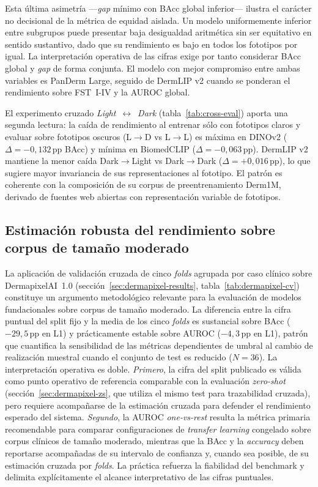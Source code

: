 Esta última asimetría ---\emph{gap} mínimo con BAcc global
inferior--- ilustra el carácter no decisional de la métrica de
equidad aislada. Un modelo uniformemente inferior entre subgrupos
puede presentar baja desigualdad aritmética sin ser equitativo en
sentido sustantivo, dado que su rendimiento es bajo en todos los
fototipos por igual. La interpretación operativa de las cifras
exige por tanto considerar BAcc global y \emph{gap} de forma
conjunta. El modelo con mejor compromiso entre ambas variables es
PanDerm Large, seguido de DermLIP v2 cuando se ponderan el
rendimiento sobre FST~I-IV y la AUROC global.

El experimento cruzado \emph{Light}~$\leftrightarrow$~\emph{Dark}
(tabla~\ref{tab:cross-eval}) aporta una segunda lectura: la caída
de rendimiento al entrenar sólo con fototipos claros y evaluar
sobre fototipos oscuros (L$\to$D vs L$\to$L) es máxima en DINOv2
($\Delta = -0{,}132$\,pp BAcc) y mínima en BiomedCLIP
($\Delta = -0{,}063$\,pp). DermLIP v2 mantiene la menor caída
Dark$\to$Light vs Dark$\to$Dark ($\Delta = +0{,}016$\,pp), lo que
sugiere mayor invariancia de sus representaciones al fototipo. El
patrón es coherente con la composición de su corpus de
preentrenamiento Derm1M, derivado de fuentes web abiertas con
representación variable de fototipos.

\subsection{Estimación robusta del rendimiento sobre corpus de tamaño moderado}
\label{sec:disc-cv-robustez}

La aplicación de validación cruzada de cinco \emph{folds} agrupada
por caso clínico sobre DermapixelAI~1.0
(secci\'on~\ref{sec:dermapixel-results},
tabla~\ref{tab:dermapixel-cv}) constituye un argumento
metodológico relevante para la evaluación de modelos
fundacionales sobre corpus de tamaño moderado. La diferencia entre
la cifra puntual del split fijo y la media de los cinco
\emph{folds} es sustancial sobre BAcc ($-29{,}5$\,pp en L1) y
prácticamente estable sobre AUROC ($-4{,}3$\,pp en L1), patrón
que cuantifica la sensibilidad de las métricas dependientes de
umbral al cambio de realización muestral cuando el conjunto de
test es reducido ($N = 36$). La interpretación operativa es
doble. \textit{Primero}, la cifra del split publicado es válida
como punto operativo de referencia comparable con la evaluación
\emph{zero-shot} (secci\'on~\ref{sec:dermapixel-zs}, que utiliza
el mismo test para trazabilidad cruzada), pero requiere
acompañarse de la estimación cruzada para defender el rendimiento
esperado del sistema. \textit{Segundo}, la AUROC
\emph{one-vs-rest} resulta la métrica primaria recomendable para
comparar configuraciones de \emph{transfer learning} congelado
sobre corpus clínicos de tamaño moderado, mientras que la BAcc y
la \emph{accuracy} deben reportarse acompañadas de su intervalo de
confianza y, cuando sea posible, de su estimación cruzada por
\emph{folds}. La práctica refuerza la fiabilidad del benchmark y
delimita explícitamente el alcance interpretativo de las cifras
puntuales.

